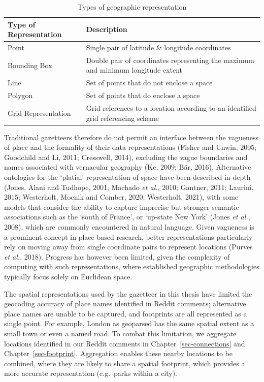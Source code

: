\documentclass[
  letterpaper,
  11pt,
  english,
  onehalfspacing,
  headsepline]{MastersDoctoralThesis}
\begin{document}
\begin{table}
    \centering
    \caption{Types of geographic representation \label{tbl-representation}}
    \fontsize{9}{11}\selectfont
    \begin{tabular}{lp{3in}}
    \toprule
        \textbf{Type of Representation} & \textbf{Description} \\
    \midrule
        Point & Single pair of latitude \& longitude coordinates \\
        Bounding Box & Double pair of coordinates representing the maximum and minimum longitude extent \\
        Line & Set of points that do not enclose a space \\
        Polygon & Set of points that do enclose a space \\
        Grid Representation & Grid references to a location according to an identified grid referencing scheme \\ \bottomrule
    \end{tabular}
\end{table}

Traditional gazetteers therefore do not permit an interface between the
vagueness of place and the formality of their data representations
(Fisher and Unwin, 2005; Goodchild and Li, 2011; Cresswell, 2014),
excluding the vague boundaries and names associated with vernacular
geography (Ke, 2009; Bär, 2016). Alternative ontologies for the
`platial' representation of space have been described in depth (Jones,
Alani and Tudhope, 2001; Machado \emph{et al.}, 2010; Gantner, 2011;
Laurini, 2015; Westerholt, Mocnik and Comber, 2020; Westerholt, 2021),
with some models that consider the ability to capture imprecise but
stronger semantic associations such as the `south of France', or
`up-state New York' (Jones \emph{et al.}, 2008), which are commonly
encountered in natural language. Given vagueness is a prominent concept
in place-based research, better representations particularly rely on
moving away from single coordinate pairs to represent locations (Purves
\emph{et al.}, 2018). Progress has however been limited, given the
complexity of computing with such representations, where established
geographic methodologies typically focus solely on Euclidean space.

The spatial representations used by the gazetteer in this thesis have
limited the geocoding accuracy of place names identified in Reddit
comments; alternative place names are unable to be captured, and
footprints are all represented as a single point. For example, London as
geoparsed has the same spatial extent as a small town or even a named
road. To combat this limitation, we aggregate locations identified in
our Reddit comments in Chapter~\ref{sec-connections} and
Chapter~\ref{sec-footprint}. Aggregation enables these nearby locations
to be combined, where they are likely to share a spatial footprint,
which provides a more accurate representation (e.g.~parks within a
city).
\end{document}
